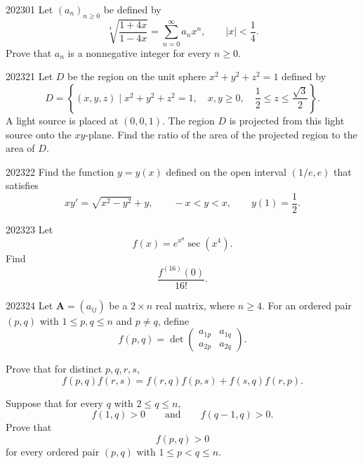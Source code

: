 
\begin{problem}{2023}{0}{1}
Let $(a_n)_{n\ge0}$ be defined by
\[
    \sqrt[4]{\frac{1+4x}{1-4x}}
    =
    \sum_{n=0}^{\infty}a_nx^n,
    \qquad
    |x|<\frac14.
\]
Prove that $a_n$ is a nonnegative integer for every $n\ge0$.
\end{problem}

\begin{problem}{2023}{2}{1}
Let $D$ be the region on the unit sphere $x^2+y^2+z^2=1$ defined by
\[
    D=
    \left\{
        (x, y, z)\mid
        x^2+y^2+z^2=1,
        \quad x, y\ge0,
        \quad \frac12\le z\le\frac{\sqrt3}{2}
    \right\}.
\]
A light source is placed at $(0, 0, 1)$. The region $D$ is projected from this light source onto the $xy$-plane. Find the ratio of the area of the projected region to the area of $D$.
\end{problem}

\begin{problem}{2023}{2}{2}
Find the function $y=y(x)$ defined on the open interval $(1/e, e)$ that satisfies
\[
    xy'=\sqrt{x^2-y^2}+y,
    \qquad
    -x<y<x,
    \qquad
    y(1)=\frac12.
\]
\end{problem}

\begin{problem}{2023}{2}{3}
Let
\[
    f(x)=e^{x^8}\sec(x^4).
\]
Find
\[
    \frac{f^{(16)}(0)}{16!}.
\]
\end{problem}

\begin{problem}{2023}{2}{4}
Let $\mathbf A=(a_{ij})$ be a $2\times n$ real matrix, where $n\ge4$. For an ordered pair $(p, q)$ with $1\le p, q\le n$ and $p\ne q$, define
\[
    f(p, q)
    =
    \det
    \begin{pmatrix}
        a_{1p}&a_{1q}\\
        a_{2p}&a_{2q}
    \end{pmatrix}.
\]
\begin{problemsubparts}
    \item Prove that for distinct $p, q, r, s$,
    \[
        f(p, q)f(r, s)
        =f(r, q)f(p, s)+f(s, q)f(r, p).
    \]
    \item Suppose that for every $q$ with $2\le q\le n$,
    \[
        f(1, q)>0
        \qquad\text{and}\qquad
        f(q-1, q)>0.
    \]
    Prove that
    \[
        f(p, q)>0
    \]
    for every ordered pair $(p, q)$ with $1\le p<q\le n$.
\end{problemsubparts}
\end{problem}

